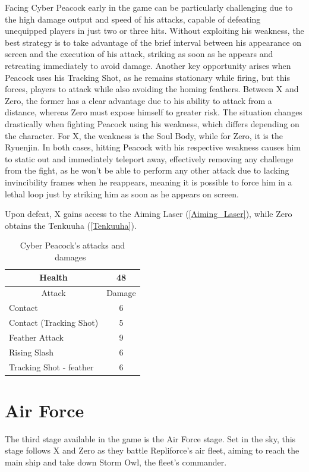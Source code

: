 Facing Cyber Peacock early in the game can be particularly challenging due to the high damage output and speed of his attacks, capable of defeating unequipped players in just two or three hits. Without exploiting his weakness, the best strategy is to take advantage of the brief interval between his appearance on screen and the execution of his attack, striking as soon as he appears and retreating immediately to avoid damage. Another key opportunity arises when Peacock uses his Tracking Shot, as he remains stationary while firing, but this forces, players to attack while also avoiding the homing feathers. Between X and Zero, the former has a clear advantage due to his ability to attack from a distance, whereas Zero must expose himself to greater risk.  The situation changes drastically when fighting Peacock using his weakness, which differs depending on the character. For X, the weakness is the Soul Body, while for Zero, it is the Ryuenjin. In both cases, hitting Peacock with his respective weakness causes him to static out and immediately teleport away, effectively removing any challenge from the fight, as he won't be able to perform any other attack  due to lacking invincibility frames when he reappears, meaning it is possible to force him in a lethal loop just by striking him as soon as he appears on screen.

Upon defeat, X gains access to the Aiming Laser (\ref{Aiming_Laser}), while Zero obtains the Tenkuuha (\ref{Tenkuuha}).  


\begin{table}[htp]
	\centering
	\begin{tabular}[h]{l c}
		\toprule
		\multicolumn{1}{c}{Health}  & 48\\
		\midrule
		\multicolumn{1}{c}{Attack} & \multicolumn{1}{c}{Damage}\\
		Contact & 6 \\
		Contact (Tracking Shot)& 5\\
		Feather Attack & 9\\
		Rising Slash & 6\\
		Tracking Shot - feather&6\\
		\bottomrule
	\end{tabular}
	\caption{Cyber Peacock's attacks and damages~\cite{book:Compendium,wiki:Cyber_peacock}}
\end{table}
 
\section{Air Force}
The third stage available in the game is the Air Force stage. Set in the sky, this stage follows X and Zero as they battle Repliforce's air fleet, aiming to reach the main ship and take down Storm Owl, the fleet's commander.  

